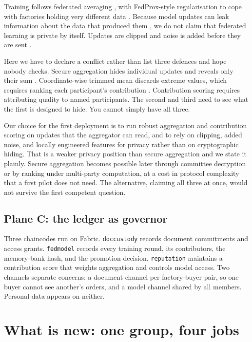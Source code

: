 \documentclass[11pt,a4paper]{article}
\begin{document}
Training follows federated averaging \citep{mcmahan2017fedavg}, with FedProx-style
regularisation to cope with factories holding very different data
\citep{li2020fedprox}. Because model updates can leak information about the data
that produced them \citep{zhu2019dlg,geiping2020inverting,shokri2017membership},
we do not claim that federated learning is private by itself. Updates are
clipped and noise is added before they are sent \citep{abadi2016dpsgd}.

Here we have to declare a conflict rather than list three defences and hope
nobody checks. Secure aggregation hides individual updates and reveals only
their sum \citep{bonawitz2017secagg}. Coordinate-wise trimmed mean discards
extreme values, which requires ranking each participant's contribution
\citep{yin2018byzantine}. Contribution scoring requires attributing quality to
named participants. The second and third need to see what the first is designed
to hide. You cannot simply have all three.

Our choice for the first deployment is to run robust aggregation and
contribution scoring on updates that the aggregator can read, and to rely on
clipping, added noise, and locally engineered features for privacy rather than
on cryptographic hiding. That is a weaker privacy position than secure
aggregation and we state it plainly. Secure aggregation becomes possible later
through committee decryption or by ranking under multi-party computation, at
a cost in protocol complexity that a first pilot does not need. The alternative,
claiming all three at once, would not survive the first competent question.

\subsection{Plane C: the ledger as governor}

Three chaincodes run on Fabric. \texttt{doccustody} records document commitments
and access grants. \texttt{fedmodel} records every training round, its
contributors, the memory-bank hash, and the promotion decision.
\texttt{reputation} maintains a contribution score that weights aggregation and
controls model access. Two channels separate concerns: a document channel per
factory-buyer pair, so one buyer cannot see another's orders, and a model
channel shared by all members. Personal data appears on neither.

\section{What is new: one group, four jobs}
\label{sec:novel}
\end{document}
